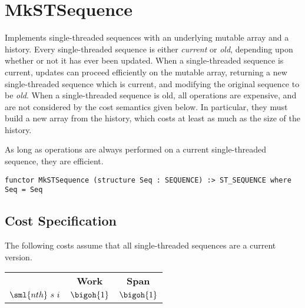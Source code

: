 \chapter{MkSTSequence}
\label{ch:st-seq}

\begin{cluster}
\label{grp:grm:st-seq::implements}

\begin{gram}
\label{grm:st-seq::implements}
\label{ch:st-seq}
\begin{preamble}
Implements single-threaded sequences with an underlying mutable array and a
history.
Every single-threaded sequence is either \emph{current} or \emph{old},
depending upon whether or not it has ever been updated.
When a single-threaded sequence is current, updates can proceed efficiently
on the mutable array, returning a new single-threaded sequence which is
current, and modifying the original sequence to be \emph{old}.
When a single-threaded sequence is old, all operations are expensive, and
are not considered by the cost semantics given below. In particular, they
must build a new array from the history, which costs at least as much as the
size of the history.

As long as operations are always performed on a current
single-threaded sequence, they are efficient.
\begin{verbatim}
functor MkSTSequence (structure Seq : SEQUENCE) :> ST_SEQUENCE where Seq = Seq
\end{verbatim}
\end{preamble}

\end{gram}
\end{cluster}


\section{Cost Specification}
\label{sec:st-seq::cost-specification}

\begin{cluster}
\label{grp:grm:st-seq::costs}

\begin{gram}
\label{grm:st-seq::costs}
The following costs assume that all single-threaded sequences are a current
version.

\end{gram}
\end{cluster}

\begin{cluster}
\label{grp:cst:st-seq::indexing}

\begin{costspec}[Indexing]
\label{cst:st-seq::indexing}
\begin{tabular}{ccc}
& \textbf{Work} & \textbf{Span} \\
$\sml{nth}~s~i$ & $\bigoh{1}$ & $\bigoh{1}$
\end{tabular}

\end{costspec}
\end{cluster}

